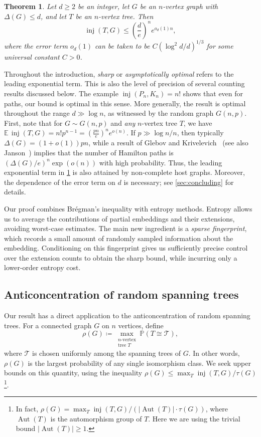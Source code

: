 \documentclass[reqno,final,a4paper]{amsart}
\numberwithin{equation}{section}
\newtheorem{theorem}{Theorem}[section]
\theoremstyle{definition}
\theoremstyle{remark}
\DeclareMathOperator{\Aut}{Aut}
\DeclareMathOperator{\inj}{inj}
\renewcommand{\Pr}{\mathbb P}
\begin{document}
\begin{theorem}\label{thm:main}
Let $d\geq 2$ be an integer, let $G$ be an $n$-vertex graph with $\Delta(G)\le d$, and let $T$ be an $n$-vertex tree. Then
\[
    \inj(T,G)\leq\left(\frac de\right)^n
    e^{o_d(1)n},
\]
where the error term $o_d(1)$ can be taken to be $C(\log^2d/d)^{1/3}$ for some universal constant $C>0$.
\end{theorem}
Throughout the introduction, \emph{sharp} or \emph{asymptotically optimal} refers to the leading exponential term. This is also the level of precision of several counting results discussed below. The example $\inj(P_n,K_n)=n!$ shows that even for paths, our bound is optimal in this sense. More generally, the result is optimal throughout the range $d\gg \log n$, as witnessed by the random graph $G(n,p)$. First, note that for $G\sim G(n,p)$ and \textit{any} $n$-vertex tree $T$, we have $\mathbb E\,\inj(T,G)=n!p^{n-1} =\left(\frac{pn}{e}\right)^n e^{o(n)}.$
If $p\gg \log n/n$, then typically $\Delta(G)=(1+o(1))pn$, while a result of Glebov and Krivelevich~\cite{glebov2013hamilton} (see also Janson~\cite{janson1994numbers}) implies that the number of Hamilton paths is $(\Delta(G)/e)^n\exp(o(n))$ with high probability.
Thus, the leading exponential term in \cref{thm:main} is also attained by non-complete host graphs.
Moreover, the dependence of the error term on $d$ is necessary; see \cref{sec:concluding} for details.

Our proof combines Brégman's inequality with entropy methods. Entropy allows us to average the contributions of partial embeddings and their extensions, avoiding worst-case estimates. The main new ingredient is a \emph{sparse fingerprint}, which records a small amount of randomly sampled information about the embedding. Conditioning on this fingerprint gives us sufficiently precise control over the extension counts to obtain the sharp bound, while incurring only a lower-order entropy cost. 

\subsection{Anticoncentration of random spanning trees}
Our result has a direct application to the anticoncentration of random spanning trees.
For a connected graph $G$ on $n$ vertices, define
\[
    \rho(G) \coloneqq \max_{\substack{n\text{-vertex}\\ \text{tree } T}} \Pr(T\cong \mathcal T),
\]
where $\mathcal T$ is chosen uniformly among the spanning trees of $G$. In other words, $\rho(G)$ is the largest probability of any single isomorphism class. We seek upper bounds on this quantity, using the inequality $\rho(G) \leq \max_T \inj(T,G)/\tau(G)$\footnote{In fact, $\rho(G)= \max_T \inj(T,G)/(|\Aut(T)|\cdot \tau(G))$, where $\Aut(T)$ is the automorphism group of $T$. Here we are using the trivial bound $|\Aut(T)|\geq 1$.}.
\end{document}
